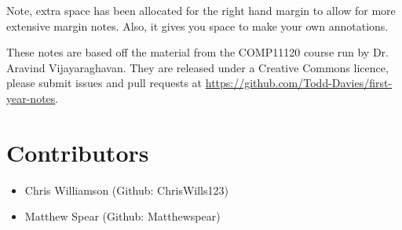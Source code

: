 \documentclass{article}
\author{\Author}
\title{\Title}
\begin{document}
\chead{}


\maketitle

{\small Note, extra space has been allocated for the right hand margin to allow
for more extensive margin notes. Also, it gives you space to make your own
annotations.}

{\small These notes are based off the material from the COMP11120 course run by 
Dr. Aravind Vijayaraghavan. They are released
under a Creative Commons licence, please submit issues and pull requests at
\url{https://github.com/Todd-Davies/first-year-notes}.}

\section*{Contributors}

\begin{itemize}
\item Chris Williamson (Github: ChrisWills123)
\item Matthew Spear (Github: Matthewspear)
\end{itemize}

\tableofcontents
\newpage


\end{document}
